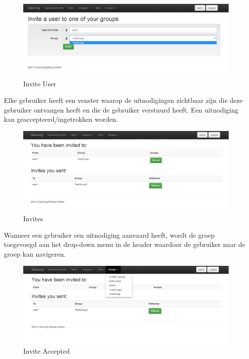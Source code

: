 \documentclass[11pt]{article}
\begin{document}
\begin{figure}[h!]
	\begin{center}
	\includegraphics[scale=0.4]{inviteUser.png}

	\caption{Invite User}
	\label{fig:inviteUser}
	\end{center}
\end{figure}

Elke gebruiker heeft een venster waarop de uitnodigingen zichtbaar zijn die deze gebruiker ontvangen heeft en die de gebruiker verstuurd heeft.  Een uitnodiging kan geaccepteerd/ingetrokken worden.\\

\begin{figure}[h!]
	\begin{center}
	\includegraphics[scale=0.4]{invites.png}

	\caption{Invites}
	\label{fig:invites}
	\end{center}
\end{figure}

Wanneer een gebruiker een uitnodiging aanvaard heeft, wordt de groep toegevoegd aan het drop-down menu in de header waardoor de gebruiker naar de groep kan navigeren.\\

\begin{figure}[h!]
	\begin{center}
	\includegraphics[scale=0.4]{inviteAccepted.png}

	\caption{Invite Accepted}
	\label{fig:inviteAccepted}
	\end{center}
\end{figure}
\end{document}
